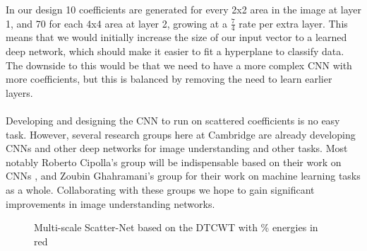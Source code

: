 \documentclass[12pt, a4paper, oneside, english]{article}
\begin{document}
In our design 10 coefficients are generated for every 2x2 area in the image at layer 1, and 70 for each 4x4 area at layer 2, growing at a $\frac{7}{4}$ rate per extra layer. This means that we would initially increase the size of our input vector to a learned deep network, which should make it easier to fit a hyperplane to classify data. The downside to this would be that we need to have a more complex CNN with more coefficients, but this is balanced by removing the need to learn earlier layers.\\\\
Developing and designing the CNN to run on scattered coefficients is no easy task. However, several research groups here at Cambridge are already developing CNNs and other deep networks for image understanding and other tasks. Most notably Roberto Cipolla's group will be indispensable based on their work on CNNs \cite{kendall_posenet:_2015, ioannou_training_2015}, and Zoubin Ghahramani's group for their work on machine learning tasks as a whole. Collaborating with these groups we hope to gain significant improvements in image understanding networks. 
\begin{figure}
\centering

\vspace{5mm}
\caption{Multi-scale Scatter-Net based on the DTCWT with \% energies in red}
\label{ScatNetBlkDTCW}
\end{figure}
\end{document}
